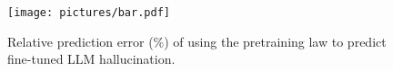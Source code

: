 \begin{figure}[htb]
    \centering
\vspace{-0.5em}
\texttt{[image: pictures/bar.pdf]}
    \vspace{-3mm}
    \caption{Relative prediction error (\%) of using the pretraining law to predict fine-tuned LLM hallucination.}\label{fig:bar}
    \vspace{-0.5em}
\end{figure}